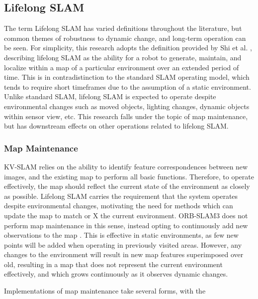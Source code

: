 \subsection{Lifelong SLAM}

The term Lifelong SLAM has varied definitions throughout the literature, but common themes of robustness to dynamic change, and long-term operation can be seen. For simplicity, this research adopts the definition provided by Shi et al. \cite{shiAreWeReady2020}, describing lifelong SLAM as the ability for a robot to generate, maintain, and localize within a map of a particular environment over an extended period of time. This is in contradistinction to the standard SLAM operating model, which tends to require short timeframes due to the assumption of a static environment. Unlike standard SLAM, lifelong SLAM is expected to operate despite environmental changes such as moved objects, lighting changes, dynamic objects within sensor view, etc. This research falls under the topic of map maintenance, but has downstream effects on other operations related to lifelong SLAM.

\subsubsection{Map Maintenance}

KV-SLAM relies on the ability to identify feature correspondences between new images, and the existing map to perform all basic functions. Therefore, to operate effectively, the map should reflect the current state of the environment as closely as possible. Lifelong SLAM carries the requirement that the system operates despite environmental changes, motivating the need for methods which can update the map to match or X the current environment. ORB-SLAM3 does not perform map maintenance in this sense, instead opting to continuously add new observations to the map \cite{camposORBSLAM3AccurateOpenSource2021}. This is effective in static environments, as few new points will be added when operating in previously visited areas. However, any changes to the environment will result in new map features superimposed over old, resulting in a map that does not represent the current environment effectively, and which grows continuously as it observes dynamic changes.

Implementations of map maintenance take several forms, with the 
